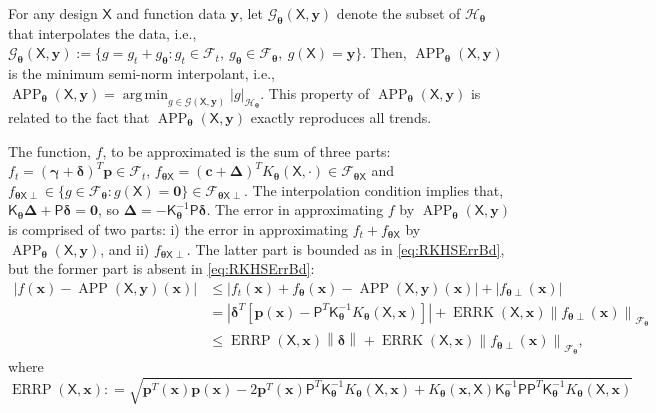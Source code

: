 \documentclass[]{mcom-l}
\theoremstyle{theorem}
\theoremstyle{remark}
\DeclareMathOperator*{\argmin}{arg\,min}
\DeclareMathOperator{\errP}{ERRP}
\DeclareMathOperator{\errK}{ERRK}
\DeclareMathOperator{\APP}{APP}
\newcommand{\mK}{\mathsf{K}}
\newcommand{\mP}{\mathsf{P}}
\newcommand{\mX}{\mathsf{X}}
\newcommand{\bzero}{\boldsymbol{0}}
\newcommand{\bc}{{\boldsymbol{c}}}
\newcommand{\bx}{{\boldsymbol{x}}}
\newcommand{\bp}{{\boldsymbol{p}}}
\newcommand{\by}{{\boldsymbol{y}}}
\newcommand{\bgamma}{{\boldsymbol{\gamma}}}
\newcommand{\bdelta}{{\boldsymbol{\delta}}}
\newcommand{\bDelta}{{\boldsymbol{\Delta}}}
\newcommand{\btheta}{{\boldsymbol{\theta}}}
\newcommand{\calf}{{\mathcal{F}}}
\newcommand{\calh}{{\mathcal{H}}}
\newcommand{\calg}{{\mathcal{G}}}
\def\abs#1{\ensuremath{\left \lvert #1 \right \rvert}}
\newcommand{\norm}[2][{}]{\ensuremath{\left \lVert #2 \right \rVert}_{#1}}
\begin{document}
For any design $\mX$ and function data $\by$, let $\calg_\btheta(\mX,\by)$ denote the subset of $\calh_\btheta$ that interpolates the data, i.e., $\calg_\btheta(\mX,\by) := \{ g = g_t + g_{\btheta} : g_t \in \calf_t, \ g_{\btheta} \in \calf_{\btheta}, \ g(\mX)  = \by\}$.  
Then, $\APP_\btheta(\mX,\by)$ is the minimum semi-norm interpolant, i.e., $\APP_\btheta(\mX,\by) = \argmin_{g \in \calg(\mX,\by)}  \abs{g}_{\calh_\btheta}$.  This property of  $\APP_\btheta(\mX,\by)$ is related to the fact that  $\APP_\btheta(\mX,\by)$ exactly reproduces all trends.

The function, $f$, to be approximated is the sum of three parts: $f_t = (\bgamma + \bdelta)^T \bp \in \calf_t$,  $f_{\btheta \mX} = (\bc + \bDelta)^T K_\btheta(\mX,\cdot) \in \calf_{\btheta \mX}$ and $f_{\btheta \mX \perp} \in \{g \in \calf_\btheta : g(\mX) = \bzero\} \in \calf_{\btheta \mX \perp}$.  The interpolation condition implies that, $\mK_\btheta \bDelta  + \mP \bdelta = \bzero$, so $\bDelta = - \mK_\btheta^{-1} \mP \bdelta$.  The error in approximating $f$ by $\APP_\btheta(\mX,\by)$ is comprised of two parts: i) the error in approximating $f_t + f_{\btheta \mX}$ by $\APP_\btheta(\mX,\by)$, and ii) $f_{\btheta \mX \perp}$.  The latter part is bounded as in \eqref{eq:RKHSErrBd}, but the former part is absent in \eqref{eq:RKHSErrBd}: 
\begin{align}
\label{eq:RKHSErrBdP}
\abs{f(\bx) - \APP(\mX,\by)(\bx)}
& \le \abs{ f_t(\bx) + f_\btheta(\bx) - \APP(\mX,\by)(\bx)} + \abs{f_{\btheta\perp}(\bx)} 
\\
\nonumber
& = \abs{ \bdelta^T [\bp(\bx)- \mP^T \mK_\btheta^{-1}K_\btheta(\mX,\bx)  ] } + \errK(\mX,\bx) \norm[\calf_\btheta]{f_{\btheta\perp}(\bx)}
\\
\nonumber
& \le \errP(\mX,\bx) \norm{\bdelta} + \errK(\mX,\bx) \norm[\calf_\btheta]{f_{\btheta\perp}(\bx)},
\end{align}
where
\begin{equation}
\errP(\mX,\bx)  : = \sqrt{\bp^T(\bx)\bp(\bx) - 2 \bp^T(\bx)\mP^T \mK_\btheta^{-1}K_\btheta(\mX,\bx)  
	+  K_\btheta(\bx,\mX)  \mK_\btheta^{-1} \mP \mP^T \mK_\btheta^{-1}K_\btheta(\mX,\bx)  }
\end{equation}
\end{document}
